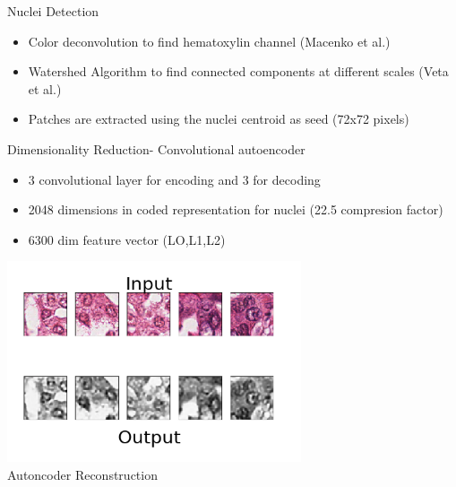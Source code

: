 \documentclass[usenames,dvipsnames]{beamer}
\begin{document}
\begin{frame}{Nuclei Detection}

\begin{itemize}
    \item Color deconvolution to find hematoxylin channel (Macenko et al.)
    \item Watershed Algorithm to find connected components at different scales (Veta et al.)
    \item Patches are extracted using the nuclei centroid as seed (72x72 pixels)
\end{itemize}
    
\end{frame}

\begin{frame}{Dimensionality Reduction- Convolutional autoencoder}
\begin{itemize}
    \item 3 convolutional layer for encoding and 3 for decoding
    \item 2048 dimensions in coded representation for nuclei (22.5 compresion factor)
    \item 6300 dim feature vector ({LO,L1,L2})
\end{itemize}
    \centering
    \includegraphics[width=0.65\textwidth]{imagenes_cnn/autoencoderresponse.png}
    \\Autoncoder Reconstruction
\end{frame}
\end{document}
